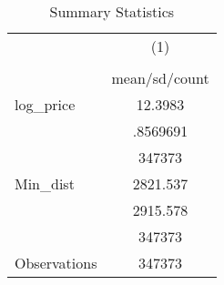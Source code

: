\begin{table}[htbp]\centering
\def\sym#1{\ifmmode^{#1}\else\(^{#1}\)\fi}
\caption{Summary Statistics}
\begin{tabular}{l*{1}{c}}
\toprule
                    &\multicolumn{1}{c}{(1)}\\
                    &\multicolumn{1}{c}{}\\
                    &mean/sd/count\\
\midrule
log\_price           &     12.3983\\
                    &    .8569691\\
                    &      347373\\
Min\_dist            &    2821.537\\
                    &    2915.578\\
                    &      347373\\
\midrule
Observations        &      347373\\
\bottomrule
\end{tabular}
\end{table}
